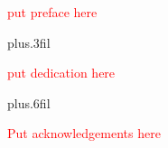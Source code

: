 \documentclass[12pt]{report}
\newcommand{\notetodylan}[1]{\textcolor{red}{#1}} %
\begin{document}
\onehalfspacing	%

\begin{preface}

\notetodylan{put preface here}

\end{preface}

\vskip0pt plus.3fil
\begin{center}
\notetodylan{put dedication here}
\end{center}
\vskip0pt plus.6fil


%
%
%
%
%
%
%
%
%
%
%
%
%
%
%
%
%
%
%
%
%
%
%
%
%
%
%
%
%
%
%
%
%
%
%
%
%
%
%


\begin{acknowledgements}
\notetodylan{Put acknowledgements here} 
\end{acknowledgements}
%
%
%
%
%
%
%
%
%
%
%
%
%
%
%
%
%
%
%
%
%
%
%
%
%
%
%
%
%
%
%
%
%
%
%
%
%
%
%
%

\tableofcontents
\listoftables
\listoffigures
\end{document}
